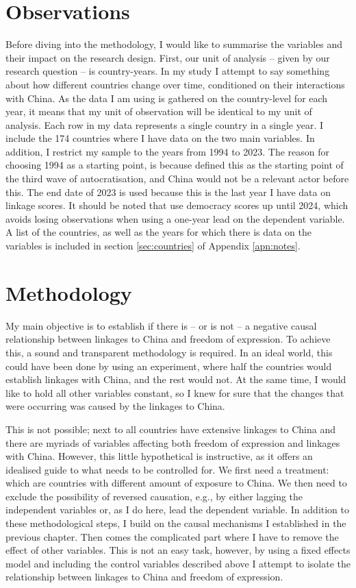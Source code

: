 \section{Observations}
Before diving into the methodology, I would like to summarise the variables and their impact on the research design. First, our unit of analysis -- given by our research question -- is country-years. In my study I attempt to say something about how different countries change over time,  conditioned on their interactions with China. As the data I am using is gathered on the country-level for each year, it means that my unit of observation will be identical to my unit of analysis. Each row in my data represents a single country in a single year. I include the 174 countries where I have data on the two main variables. In addition, I restrict my sample to the years from 1994 to 2023. The reason for choosing 1994 as a starting point, is because \citet{luhrmann_third_2019} defined this as the starting point of the third wave of autocratisation, and China would not be a relevant actor before this. The end date of 2023 is used because this is the last year I have data on linkage scores. It should be noted that use democracy scores up until 2024,  which avoids losing observations when using a one-year lead on the dependent variable. A list of the countries, as well as the years for which there is data on the variables is included in section \ref{sec:countries} of Appendix \ref{apn:notes}. 

\section{Methodology}
My main objective is to establish if there is -- or is not -- a negative causal relationship between linkages to China and freedom of expression. To achieve this, a sound and transparent methodology is required. In an ideal world, this could have been done by using an experiment, where half the countries would establish linkages with China, and the rest would not. At the same time, I would like to hold all other variables constant, so I knew for sure that the changes that were occurring was caused by the linkages to China.

This is not possible; next to all countries have extensive linkages to China and there are myriads of variables affecting both freedom of expression and linkages with China. However, this little hypothetical is instructive, as it offers an idealised guide to what needs to be controlled for. We first need a treatment: which are countries with different amount of exposure to China. We then need to exclude the possibility of reversed causation, e.g., by either lagging the independent variables or, as I do here, lead the dependent variable. In addition to these methodological steps, I build on the causal mechanisms I established in the previous chapter. Then comes the complicated part where I have to remove the effect of other variables. This is not an easy task, however, by using a fixed effects model and including the control variables described above I attempt to isolate the relationship between linkages to China and freedom of expression.

